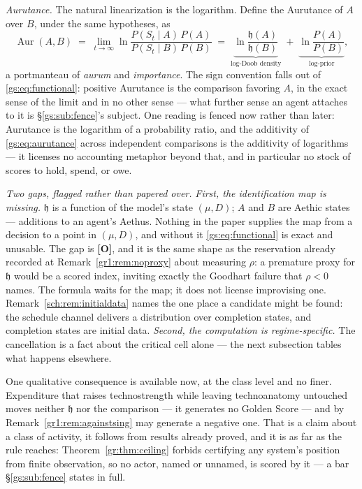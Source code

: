 \documentclass[11pt]{article}
\numberwithin{equation}{section}
\theoremstyle{plain}
\theoremstyle{definition}
\theoremstyle{remark}
\newcommand{\hm}{\mathfrak{h}}
\begin{document}
\emph{Aurutance.} The natural linearization is the logarithm. Define the Aurutance of $A$ over $B$, under the same hypotheses, as
\begin{equation}\label{gs:eq:aurutance}
    \operatorname{Aur}(A, B) \;=\; \lim_{t \to \infty} \ln \frac{P(S_t \mid A)\,P(A)}{P(S_t \mid B)\,P(B)}
    \;=\; \underbrace{\ln \frac{\hm(A)}{\hm(B)}}_{\text{log-Doob density}} \;+\; \underbrace{\ln \frac{P(A)}{P(B)}}_{\text{log-prior}},
\end{equation}
a portmanteau of \emph{aurum} and \emph{importance}. The sign convention falls out of \eqref{gs:eq:functional}: positive Aurutance is the comparison favoring $A$, in the exact sense of the limit and in no other sense --- what further sense an agent attaches to it is \S\ref{gs:sub:fence}'s subject. One reading is fenced now rather than later: Aurutance is the logarithm of a probability ratio, and the additivity of \eqref{gs:eq:aurutance} across independent comparisons is the additivity of logarithms --- it licenses no accounting metaphor beyond that, and in particular no stock of scores to hold, spend, or owe.

\emph{Two gaps, flagged rather than papered over.} \emph{First, the identification map is missing.} $\hm$ is a function of the model's state $(\mu, D)$; $A$ and $B$ are Aethic states --- additions to an agent's Aethus. Nothing in the paper supplies the map from a decision to a point in $(\mu, D)$, and without it \eqref{gs:eq:functional} is exact and unusable. The gap is \textbf{[O]}, and it is the same shape as the reservation already recorded at Remark~\ref{gr1:rem:noproxy} about measuring $\rho$: a premature proxy for $\hm$ would be a scored index, inviting exactly the Goodhart failure that $\rho < 0$ names. The formula waits for the map; it does not license improvising one.
Remark~\ref{sch:rem:initialdata} names the one place a candidate might be
found: the schedule channel delivers a distribution over completion
states, and completion states are initial data. \emph{Second, the computation is regime-specific.} The cancellation is a fact about the critical cell alone --- the next subsection tables what happens elsewhere.

One qualitative consequence is available now, at the class level and no finer. Expenditure that raises technostrength while leaving technoanatomy untouched moves neither $\hm$ nor the comparison --- it generates no Golden Score --- and by Remark~\ref{gr1:rem:againstsing} may generate a negative one. That is a claim about a class of activity, it follows from results already proved, and it is as far as the rule reaches: Theorem~\ref{gr:thm:ceiling} forbids certifying any system's position from finite observation, so no actor, named or unnamed, is scored by it --- a bar \S\ref{gs:sub:fence} states in full.
\end{document}
